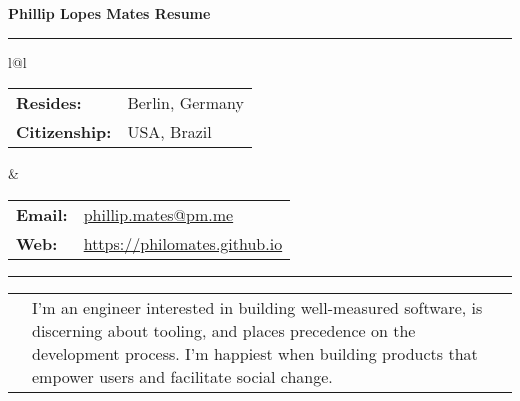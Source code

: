 \documentclass[10pt]{article}
\makeatletter
\newcommand{\category}[2]{
\begin{center}
\vskip 6pt
\begin{tabular*}{\textwidth}{@{}p{0.75in}@{\quad\;\;}p{4in}@{\quad\quad}p{0.7in}}
\vcrush[t]{1in}{\textsc{#1}} &
#2
\end{tabular*}
\end{center}
}
\makeatother
\begin{document}

{\LARGE \bf \sc
\noindent Phillip Lopes Mates\hspace{\stretch 1}
Resume
}
\vskip 10pt
\hrule


\begin{center}
\vskip -5pt
\begin{tabular*}{\textwidth}{l@{\extracolsep{\fill}}l}

\begin{tabular}[t]{ll}
{\small\bf Resides:} & {\small Berlin, Germany} \\
{\small\bf Citizenship:} & {\small USA, Brazil}

\end{tabular} &

\begin{tabular}[t]{ll}
{\small\bf Email:} & {\small \url{phillip.mates@pm.me}}\\
{\small\bf Web:} & {\small \url{https://philomates.github.io}}\\
\end{tabular}

\end{tabular*}
\end{center}

\vskip -6pt
\hrule


\category{Statement}{
I'm an engineer interested in building well-measured software, is discerning about tooling, and places precedence on the development process. I’m happiest when building products that empower users and facilitate social change.
}

\end{document}
